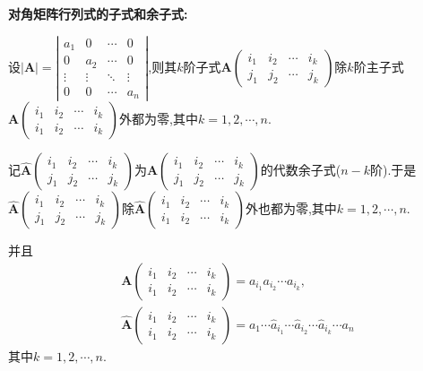 \documentclass[lang=cn,newtx,10pt,scheme=chinese]{elegantbook}
\begin{document}
\begin{conclusion}\label{对角矩阵行列式的子式和余子式}
   \hypertarget{对角矩阵行列式的子式和余子式}{\textbf{对角矩阵行列式的子式和余子式:}}

   设\(|\boldsymbol{A}|=\left|\begin{matrix}
    a_1 & 0 & \cdots & 0\\
    0 & a_2 & \cdots & 0\\
    \vdots & \vdots & \ddots & \vdots\\
    0 & 0 & \cdots & a_n
    \end{matrix}\right|\),则其\(k\)阶子式\(\boldsymbol{A}\left(\begin{matrix}
    i_1 & i_2 & \cdots & i_k\\
    j_1 & j_2 & \cdots & j_k
    \end{matrix}\right)\)除\(k\)阶主子式\(\boldsymbol{A}\left(\begin{matrix}
    i_1 & i_2 & \cdots & i_k\\
    i_1 & i_2 & \cdots & i_k
    \end{matrix}\right)\)外都为零,其中\(k = 1,2,\cdots,n\).
    
    记\(\widehat{\boldsymbol{A}}\left(\begin{matrix}
    i_1 & i_2 & \cdots & i_k\\
    j_1 & j_2 & \cdots & j_k
    \end{matrix}\right)\)为\(\boldsymbol{A}\left(\begin{matrix}
    i_1 & i_2 & \cdots & i_k\\
    j_1 & j_2 & \cdots & j_k
    \end{matrix}\right)\)的代数余子式(\(n - k\)阶).于是\(\widehat{\boldsymbol{A}}\left(\begin{matrix}
    i_1 & i_2 & \cdots & i_k\\
    j_1 & j_2 & \cdots & j_k
    \end{matrix}\right)\)除\(\widehat{\boldsymbol{A}}\left(\begin{matrix}
    i_1 & i_2 & \cdots & i_k\\
    i_1 & i_2 & \cdots & i_k
    \end{matrix}\right)\)外也都为零,其中\(k = 1,2,\cdots,n\).
    
    并且
    \begin{align*}
        &\boldsymbol{A}\left(\begin{matrix}
    i_1 & i_2 & \cdots & i_k\\
    i_1 & i_2 & \cdots & i_k
    \end{matrix}\right) = a_{i_1}a_{i_2}\cdots a_{i_k},
    \\
    &\widehat{\boldsymbol{A}}\left(\begin{matrix}
    i_1 & i_2 & \cdots & i_k\\
    i_1 & i_2 & \cdots & i_k
    \end{matrix}\right) = a_1\cdots \hat{a}_{i_1}\cdots \hat{a}_{i_2}\cdots \hat{a}_{i_k}\cdots a_n\,
    \end{align*}
    其中\(k = 1,2,\cdots,n\).
\end{conclusion}
\end{document}
